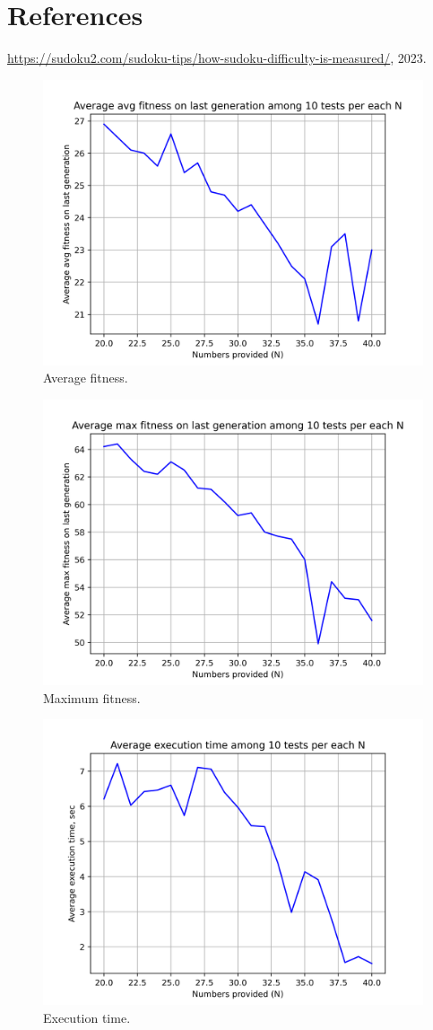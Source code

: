 \documentclass{article}
\begin{document}
\section{References}

\begin{thebibliography}{99}
    \href{Sudoku Complexity Classification.}{https://sudoku2.com/sudoku-tips/how-sudoku-difficulty-is-measured/}, 2023.
\end{thebibliography}

\begin{figure}[h]
    \centering
   \includegraphics[width=0.8\linewidth]{avgfit.png}
    \caption{Average fitness.}
\end{figure}
\begin{figure}[h]
    \centering
   \includegraphics[width=0.8\linewidth]{maxfit.png}
    \caption{Maximum fitness.}
\end{figure}
\begin{figure}[h]
    \centering
   \includegraphics[width=0.8\linewidth]{exec.png}
    \caption{Execution time.}
\end{figure}
\end{document}
